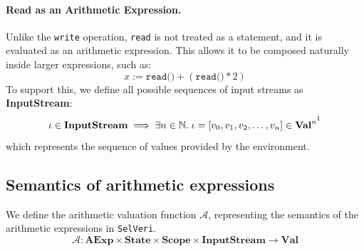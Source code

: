 \documentclass{article}
\begin{document}
\paragraph{Read as an Arithmetic Expression.}
Unlike the \texttt{write} operation, \texttt{read} is not treated as a statement, and it is evaluated as an arithmetic expression. This allows it to be composed naturally inside larger expressions, such as:
\[
    x := \texttt{read()} + (\texttt{read()} * 2)
\]
To support this, we define all possible sequences of input streams as \textbf{InputStream}:
\[
    \iota \in \textbf{InputStream}  \implies \exists n \in \mathbb{N}.\; \iota = [v_0, v_1, v_2, \dots, v_n] \in \textbf{Val}^{n\footnotemark} 
\]
which represents the sequence of values provided by the environment.

\newpage
\subsection{Semantics of arithmetic expressions}

We define the arithmetic valuation function $\mathcal{A}$, representing the semantics of the arithmetic expressions in \texttt{SelVeri}.
\[
\mathcal{A} : \textbf{AExp} \times \textbf{State} \times \textbf{Scope} \times \textbf{InputStream} \to \textbf{Val} 
\]
\end{document}
